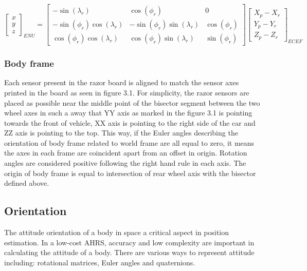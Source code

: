 \begin{equation}
    \begin{bmatrix}
        x \\
        y \\
        z
    \end{bmatrix}_{ENU}
    =
    \begin{bmatrix}
        -\sin(\lambda_r)             & \cos( \phi_r)                 & 0            \\
        -\sin(\phi_r)\cos(\lambda_r) & -\sin( \phi_r)\sin(\lambda_r) & \cos(\phi_r) \\
        \cos(\phi_r)\cos(\lambda_r)  & \cos(\phi_r) \sin(\lambda_r)  & \sin(\phi_r)
    \end{bmatrix}
    \begin{bmatrix}
        X_p - X_r \\
        Y_p - Y_r \\
        Z_p - Z_r
    \end{bmatrix}_{ECEF}
    \label{eq:transformation_results}
\end{equation}

\subsubsection{Body frame}

Each sensor present in the razor board is aligned to match the sensor axes printed in the board as seen in figure 3.1. For simplicity, the razor sensors are placed as possible near the middle point of the bisector segment between the two wheel axes in such a away that YY axis as marked in the figure 3.1 is pointing towards the front of vehicle, XX axis is pointing to the right side of the car and ZZ axis is pointing to the top. This way, if the Euler angles describing the orientation of body frame related to world frame are all equal to zero, it means the axes in each frame are coincident apart from an offset in origin. Rotation angles are considered positive following the right hand rule in each axis. The origin of body frame is equal to intersection of rear wheel axis with the bisector defined above.

\newpage
\subsection{Orientation}
\label{sub:orientation}

The attitude orientation of a body in space a critical aspect in position estimation. In a low-cost AHRS, accuracy and low complexity are important in calculating the attitude of a body. There are various ways to represent attitude including: rotational matrices, Euler angles and quaternions.

